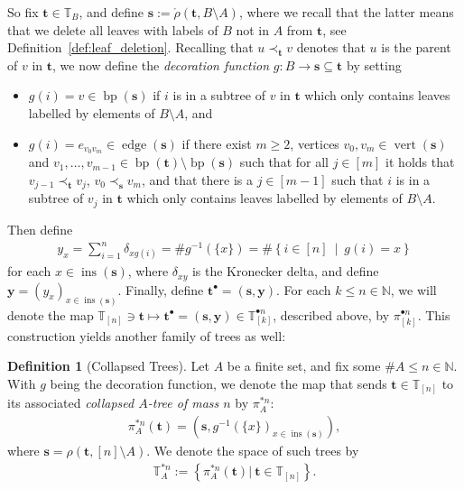\documentclass[a4paper, final]{amsart}
\theoremstyle{plain}
\theoremstyle{definition}
\newtheorem{defi}[thm]{Definition}
\newcommand{\tree}[1][t]{\boldsymbol{#1}}
\newcommand{\T}{\mathbb{T}}
\DeclareMathOperator{\edge}{edge}
\DeclareMathOperator{\vertices}{vert}
\DeclareMathOperator{\insertable}{ins}
\DeclareMathOperator{\branchpoints}{bp}
\newcommand{\insertablef}[1][\tree]{\insertable({\tree[#1]})}
\newcommand{\N}{\mathbb{N}}
\begin{document}
So fix $\tree \in \T_B$, and define $\tree[s] := \mathring{\rho} \left( \tree, B \setminus A \right)$, where we recall that the latter means that we delete all leaves with labels of $B$ not in $A$ from $\tree$, see Definition~\ref{def:leaf_deletion}.
Recalling that $u \prec_{\tree} v$ denotes that $u$ is the parent of $v$ in $\tree$, we now define the \textit{decoration function} $g \colon B \to \tree[s] \subseteq \tree$ by setting 
%
\begin{itemize}
  \item $g(i) = v \in \branchpoints (\tree[s])$ if $i$ is in a subtree of $v$ in $\tree$ which only contains leaves labelled by elements of $B \setminus A$, and
  \item $g(i) = e_{v_0v_m} \in \edge (\tree[s])$ if there exist $m \geq 2$, vertices $v_0, v_m \in \vertices (\tree[s])$ and $v_1, \ldots, v_{m-1} \in \branchpoints(\tree[t]) \setminus \branchpoints(\tree[s])$ such that for all $j \in [m]$ it holds that $v_{j-1} \prec_{\tree} v_j$, $v_0 \prec_{\tree[s]} v_m$, and that there is a $j \in [m-1]$ such that $i$ is in a subtree of $v_j$ in $\tree$ which only contains leaves labelled by elements of $B \setminus A$.
\end{itemize}
%
Then define
%
\begin{align}
  y_x = \sum_{i = 1}^n \delta_{x g(i)} = \# g^{-1}(\{x\}) = \# \left\{ i \in [n] \ \middle \vert \ g(i) = x \right\}
  \label{eq:decoratedweights}
\end{align}
%
for each $x \in \insertablef[s]$, where $\delta_{xy}$ is the Kronecker delta, and define $\mathbf{y} = {(y_x)}_{x \in \insertablef[s]}$.
Finally, define $\tree^\bullet = (\tree[s], \mathbf{y})$.
For each $k \leq n \in \N$, we will denote the map $\T_{[n]} \ni \tree \mapsto \tree^\bullet = (\tree[s], \mathbf{y}) \in \T_{[k]}^{\bullet n}$, described above, by $\pi_{[k]}^{\bullet n}$.
This construction yields another family of trees as well:
%
\begin{defi}[Collapsed Trees]
  \label{def:collapsed_trees}
  Let $A$ be a finite set, and fix some $\# A \leq n \in \N$.
  With $g$ being the decoration function, we denote the map that sends $\tree \in \T_{[n]}$ to its associated \textit{collapsed $A$-tree of mass $n$} by $\pi_{A}^{*n}$:
  \begin{align}
    \pi_A^{*n} ( \tree ) = \left( \tree[s], {g^{-1}(\{x\})}_{x \in \insertablef[s]} \right),
    \label{eq:collapsedtrees_associated}
  \end{align}
  where $\tree[s] = \rho \left( \tree, [n] \setminus A \right)$.
  We denote the space of such trees by
  \begin{align}
    \T_A^{*n} :=
  \left\{ \pi_{A}^{* n} \left( \tree \right) \bigg \vert \ \tree \in \T_{[n]} \right\}.
    \label{eq:collapsedtrees}
  \end{align}
\end{defi}
\end{document}

